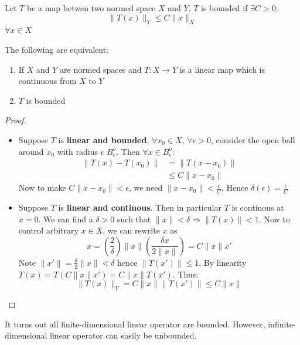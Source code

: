 \begin{definition}Let $T$ be a map betwen two normed space $X$ and $Y$. $T$ is bounded if $\exists C>0$:
\begin{equation}
\|T(x)\|_Y\leq C\|x\|_X
\end{equation}
$\forall x \in X$

\end{definition}\begin{proposition}The following are equivalent:

\begin{enumerate}
\item If $X$ and $Y$ are normed spaces and $T:X\to Y$ is a linear map which is continuous from $X$ to $Y$
\item $T$ is bounded
\end{enumerate}

\end{proposition}\begin{proof}\begin{itemize}
\item Suppose $T$ is \textbf{linear and bounded}, $\forall x_0 \in X$, $\forall \epsilon > 0$, consider the open ball around $x_0$ with radius $\epsilon$ $B_{\epsilon}^o$. Then $\forall x\in B_{\epsilon}^o$:
\begin{equation}
\begin{aligned}
\|T(x)-T(x_0)\| &= \|T(x-x_0)\| \\
&\leq C\|x-x_0\|
\end{aligned}
\end{equation}
Now to make $C\|x -x_0\|<\epsilon$, we need $\|x -x_0\|<\frac{\epsilon}{C}$. Hence $\delta(\epsilon)=\frac{\epsilon}{C}$


\item Suppose $T$ is \textbf{linear and continous}. Then in particular $T$ is continous at $x=0$. We can find a $\delta >0$ such that $\|x\| < \delta \Rightarrow \|T(x)\| < 1$. Now to control arbitrary $x\in X$, we can rewrite $x$ as
\begin{equation}
x=\left(\frac{2}{\delta }\right)\|x\|\left(\frac{\delta x}{2\|x\|}\right)=C\|x\|x'
\end{equation}
Note $\|x'\|=\frac{\delta }{2}\|x\|<\delta$ hence $\|T(x')\|\leq 1$. By linearity $T(x)=T(C\|x\|x')=C\|x\|T(x')$. Thus:
\begin{equation}
\|T(x)\|_Y=C\|x\|\|T(x')\|\leq C\|x\|
\end{equation}
\end{itemize}

\end{proof}It turns out all finite-dimensional linear operator are bounded. However, infinite-dimensional linear operator can easily be unbounded.

